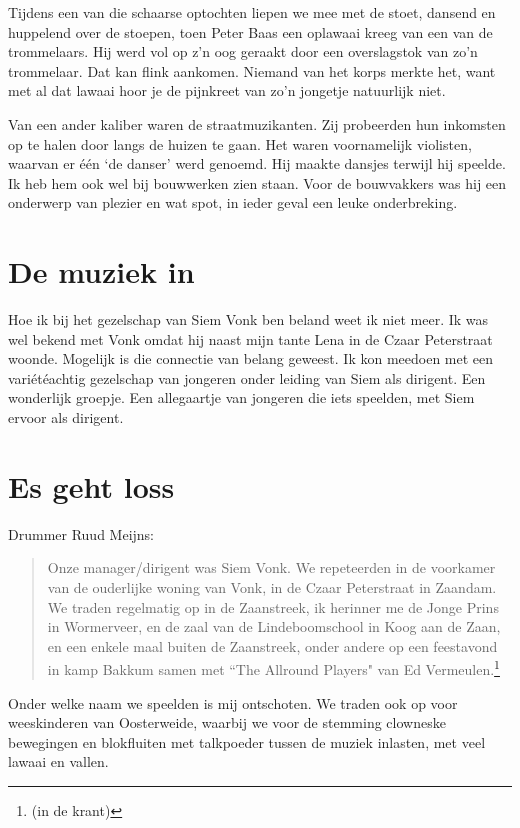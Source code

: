 \documentclass[10pt,twoside,openright]{memoir}
\begin{document}
Tijdens een van die schaarse optochten liepen we mee met de stoet, dansend en huppelend over de stoepen, toen Peter Baas een oplawaai kreeg van een van de trommelaars. Hij werd vol op z’n oog geraakt door een overslagstok van zo’n trommelaar. 
Dat kan flink aankomen. Niemand van het korps merkte het, want met al dat lawaai hoor je de pijnkreet van zo’n jongetje natuurlijk niet.

Van een ander kaliber waren de straatmuzikanten. Zij probeerden hun inkomsten op te halen door langs de huizen te gaan. Het waren voornamelijk violisten, waarvan er één ‘de danser’ werd genoemd. Hij maakte dansjes terwijl hij speelde. Ik heb hem ook wel bij bouwwerken zien staan. Voor de bouwvakkers was hij een onderwerp van plezier en wat spot, in ieder geval een leuke onderbreking.

\chapter{De muziek in} %
\label{cha:muziek_in}

Hoe ik bij het gezelschap van Siem Vonk ben beland weet ik niet meer. Ik was wel bekend met Vonk omdat hij naast mijn tante Lena in de Czaar Peterstraat woonde. Mogelijk is die connectie van belang geweest. Ik kon meedoen met een variétéachtig gezelschap van jongeren onder leiding van Siem als dirigent. Een wonderlijk groepje. Een allegaartje van jongeren die iets speelden, met Siem ervoor als dirigent.

\chapter{Es geht loss} %
\label{cha:gehtloss}

Drummer Ruud Meijns: 

\begin{quote}
Onze manager/dirigent was Siem Vonk. We repeteerden in de voorkamer van de ouderlijke woning van Vonk, in de Czaar Peterstraat in Zaandam. We traden regelmatig op in de Zaanstreek, ik herinner me de Jonge Prins in Wormerveer, en de zaal van de Lindeboomschool in Koog aan de Zaan, en een enkele maal buiten de Zaanstreek, onder andere op een feestavond in kamp Bakkum samen met ``The Allround Players" van Ed Vermeulen.\footnote{(in de krant)}
\end{quote}

Onder welke naam we speelden is mij ontschoten. We traden ook op voor weeskinderen van Oosterweide, waarbij we voor de stemming clowneske bewegingen en blokfluiten met talkpoeder tussen de muziek inlasten, met veel lawaai en vallen. 
\end{document}
